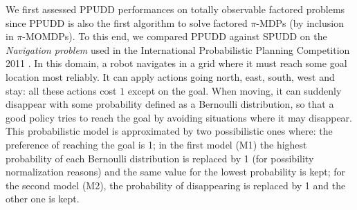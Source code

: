 We first assessed PPUDD performances on totally observable factored problems since PPUDD 
is also the first algorithm to solve factored $\pi$-MDPs (by inclusion in $\pi$-MOMDPs). 
To this end, we compared PPUDD against SPUDD on the \textit{Navigation problem} used in the International Probabilistic Planning
Competition 2011 \cite{SannerIPPC1111}. 
In this domain, a robot navigates in a grid
where it must reach some goal location most reliably. 
It can apply actions going north, east, south, west and stay: 
all these actions cost $1$ except on the goal. 
When moving, it can suddenly disappear with
some probability defined as a Bernoulli distribution, 
so that a good policy
tries to reach the goal by avoiding situations where it may disappear. 
This probabilistic model is approximated by two possibilistic ones where: 
the preference of reaching the goal is 1; in the first model (M1) the highest probability of each Bernoulli
distribution is replaced by 1 (for possibility normalization reasons) and
the same value for the lowest probability is kept; for the second model (M2), the probability of disappearing
is replaced by 1 and the other one is kept. 
